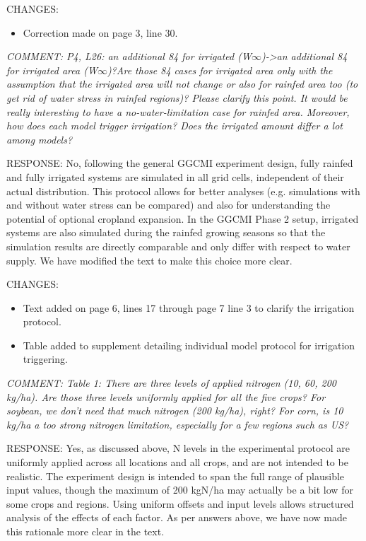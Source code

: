 \documentclass[gmd, manuscript]{copernicus} %
\begin{document}
CHANGES:
\begin{itemize}
    \item Correction made on page 3, line 30.
\end{itemize}

\smallskip

\textcolor{dark-gray}{\textit{COMMENT: P4, L26: an additional 84 for irrigated (W$\infty$)->an additional 84 for irrigated area (W$\infty$)?Are those 84 cases for irrigated area only with the assumption that the irrigated area will not change or also for rainfed area too (to get rid of water stress in rainfed regions)? Please clarify this point. It would be really interesting to have a no-water-limitation case for rainfed area. Moreover, how does each model trigger irrigation? Does the irrigated amount differ a lot among models?}}

RESPONSE: No, following the general GGCMI experiment design, fully rainfed and fully irrigated systems are simulated in all grid cells, independent of their actual distribution. This protocol allows for better analyses (e.g. simulations with and without water stress can be compared) and also for understanding the potential of optional cropland expansion. In the GGCMI Phase 2 setup, irrigated systems are also simulated during the rainfed growing seasons so that the simulation results are directly comparable and only differ with respect to water supply. We have modified the text to make this choice more clear.
\smallskip

CHANGES:
\begin{itemize}
    \item Text added on page 6, lines 17  through page 7 line 3 to clarify the irrigation protocol.
    \item Table added to supplement detailing individual model protocol for irrigation triggering.
\end{itemize}

\smallskip

\textcolor{dark-gray}{\textit{COMMENT: Table 1: There are three levels of applied nitrogen (10, 60, 200 kg/ha). Are those three levels uniformly applied for all the five crops? For soybean, we don’t need that much nitrogen (200 kg/ha), right? For corn, is 10 kg/ha a too strong nitrogen limitation, especially for a few regions such as US?}}

RESPONSE: Yes, as discussed above, N levels in the experimental protocol are uniformly applied across all locations and all crops, and are not intended to be realistic. The experiment design is intended to span the full range of plausible input values, though the maximum of 200 kgN/ha may actually be a bit low for some crops and regions. Using uniform offsets and input levels allows structured analysis of the effects of each factor. As per answers above, we have now made this rationale more clear in the text.
\smallskip
\end{document}
